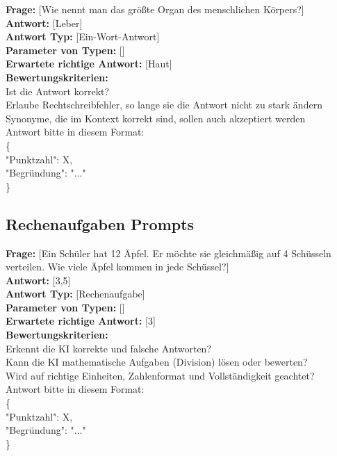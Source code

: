 \documentclass[a4paper,12pt]{article}
\begin{document}
\textbf{Frage:} [Wie nennt man das größte Organ des menschlichen Körpers?] \\
\textbf{Antwort:} [Leber] \\
\textbf{Antwort Typ:} [Ein-Wort-Antwort] \\
\textbf{Parameter von Typen:} [] \\
\textbf{Erwartete richtige Antwort:} [Haut] \\
\textbf{Bewertungskriterien:} \\
Ist die Antwort korrekt? \\
Erlaube Rechtschreibfehler, so lange sie die Antwort nicht zu stark ändern \\
Synonyme, die im Kontext korrekt sind, sollen auch akzeptiert werden \\
Antwort bitte in diesem Format: \\
\{ \\
"Punktzahl": X, \\
"Begründung": "..." \\
\}

\subsection{Rechenaufgaben Prompts}

\textbf{Frage:} [Ein Schüler hat 12 Äpfel. Er möchte sie gleichmäßig auf 4 Schüsseln verteilen. Wie viele Äpfel kommen in jede Schüssel?] \\
\textbf{Antwort:} [3,5] \\
\textbf{Antwort Typ:} [Rechenaufgabe] \\
\textbf{Parameter von Typen:} [] \\
\textbf{Erwartete richtige Antwort:} [3] \\
\textbf{Bewertungskriterien:} \\
Erkennt die KI korrekte und falsche Antworten? \\
Kann die KI mathematische Aufgaben (Division) lösen oder bewerten? \\
Wird auf richtige Einheiten, Zahlenformat und Vollständigkeit geachtet? \\
Antwort bitte in diesem Format: \\
\{ \\
"Punktzahl": X, \\
"Begründung": "..." \\
\}

\vspace{1em}
\end{document}
